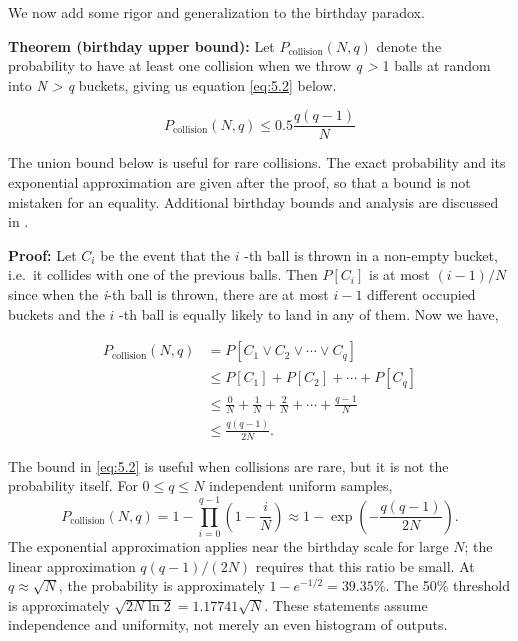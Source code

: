 We now add some rigor and generalization to the birthday paradox.

\textbf{Theorem (birthday upper bound):} Let \(P_{\mathrm{collision}}(N,q)\) denote the
probability to have at least one collision when we throw \emph{q
\textgreater{}} 1 balls at random into \emph{N \textgreater{} q}
buckets, giving us equation \eqref{eq:5.2} below.

\begin{equation}\label{eq:5.2}
P_{\mathrm{collision}}(N,q)\le0.5\frac{q(q-1)}{N}
\end{equation}

The union bound below is useful for rare collisions. The exact probability
and its exponential approximation are given after the proof, so that a
bound is not mistaken for an equality. Additional birthday bounds and
analysis are discussed in \cite{ref26}.

\textbf{Proof:} Let \(C_i\) be the event that the \(i\) -th ball is
thrown in a non-empty bucket, i.e.~it collides with one of the previous
balls. Then \(P[C_i]\) is at most \((i-1)/N\) since when the \emph{i}-th
ball is thrown, there are at most \(i-1\) different occupied buckets and
the \(i\) -th ball is equally likely to land in any of them. Now we
have,

\begin{equation}\label{eq:5.3}
\begin{aligned}P_{\mathrm{collision}}(N,q)&=P[C_1\lor C_2\lor\cdots\lor C_q]\\&\le P[C_1]+P[C_2]+\cdots+P[C_q]\\&\le\frac0N+\frac1N+\frac2N+\cdots+\frac{q-1}{N}\\&\le\frac{q(q-1)}{2N}.\end{aligned}
\end{equation}

The bound in \eqref{eq:5.2} is useful when collisions are rare, but it is
not the probability itself. For $0\le q\le N$ independent uniform samples,
\[
P_{\mathrm{collision}}(N,q)
 =1-\prod_{i=0}^{q-1}\left(1-\frac{i}{N}\right)
 \approx1-\exp\left(-\frac{q(q-1)}{2N}\right).
\]
The exponential approximation applies near the birthday scale for large
$N$; the linear approximation $q(q-1)/(2N)$ requires that this ratio be small.
At $q\approx\sqrt N$, the probability is approximately $1-e^{-1/2}=39.35\%$.
The 50\% threshold is approximately $\sqrt{2N\ln2}=1.17741\sqrt N$.
These statements assume independence and uniformity, not merely an even
histogram of outputs.

